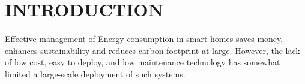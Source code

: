 \documentclass[a4paper,12pt,oneside]{article}
\begin{document}
\setlength{\baselineskip}{1.0\baselineskip}
\newpage
\begin{center}
\tableofcontents
\end{center}

\newpage
\thispagestyle{plain}
\begin{center}
\listoffigures
\end{center}

\newpage
\thispagestyle{plain}
\begin{center}
\listoftables
\end{center}




\newpage
\rfoot{\thepage}
\rfoot{\thepage}
\renewcommand{\headrulewidth}{0.0pt}
\renewcommand{\footrulewidth}{0.0pt}
\renewcommand{\headrulewidth}{0.0pt}
\renewcommand{\footrulewidth}{0.0pt}
\section{INTRODUCTION}
\paragraph{}
Effective management of Energy consumption in smart homes saves money,
enhances sustainability and reduces carbon footprint at
large. However, the lack of low cost, easy to deploy, and low
maintenance technology has somewhat limited a large-scale deployment of such systems.
\end{document}
